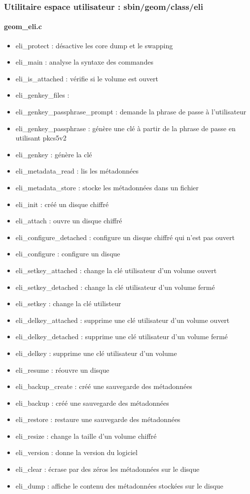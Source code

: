 \subsubsection{Utilitaire espace utilisateur : sbin/geom/class/eli}
\paragraph{geom\_eli.c}
\begin{itemize}
	\item eli\_protect : désactive les core dump et le swapping
	\item eli\_main : analyse la syntaxe des commandes
	\item eli\_is\_attached : vérifie si le volume est ouvert
	\item eli\_genkey\_files : 
	\item eli\_genkey\_passphrase\_prompt : demande la phrase de passe à
		l'utilisateur
	\item eli\_genkey\_passphrase : génère une clé à partir de la phrase de
		passe en utilisant pkcs5v2
	\item eli\_genkey : génère la clé 
	\item eli\_metadata\_read : lis les métadonnées
	\item eli\_metadata\_store : stocke les métadonnées dans un fichier
	\item eli\_init : créé un disque chiffré
	\item eli\_attach : ouvre un disque chiffré
	\item eli\_configure\_detached : configure un disque chiffré qui n'est pas ouvert
	\item eli\_configure : configure un disque 
	\item eli\_setkey\_attached : change la clé utilisateur d'un volume ouvert
	\item eli\_setkey\_detached : change la clé utilisateur d'un volume fermé
	\item eli\_setkey : change la clé utilisteur
	\item eli\_delkey\_attached : supprime une clé utilisateur d'un volume ouvert
	\item eli\_delkey\_detached : supprime une clé utilisateur d'un volume fermé
	\item eli\_delkey : supprime une clé utilisateur d'un volume
	\item eli\_resume : réouvre un disque 
	\item eli\_backup\_create : créé une sauvegarde des métadonnées
	\item eli\_backup : créé une sauvegarde des métadonnées
	\item eli\_restore : restaure une sauvegarde des métadonnées
	\item eli\_resize : change la taille d'un volume chiffré
	\item eli\_version : donne la version du logiciel
	\item eli\_clear : écrase par des zéros les métadonnées sur le disque
	\item eli\_dump : affiche le contenu des métadonnées stockées sur le disque
\end{itemize}
